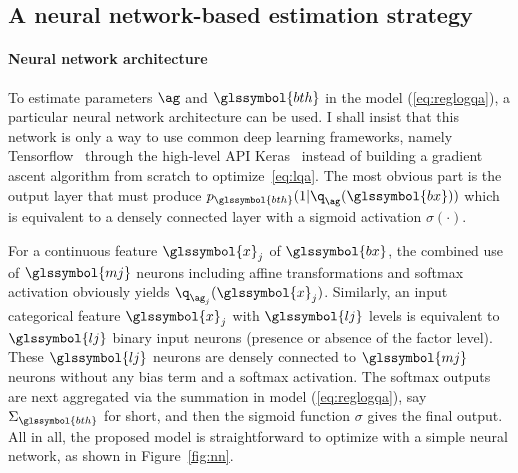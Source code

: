 \subsection{A neural network-based estimation strategy} \label{sec:estim}

\paragraph{Neural network architecture}

To estimate parameters $\ag$ and $\glssymbol{bth}$ in the model (\ref{eq:reglogqa}), a particular neural network architecture can be used. I shall insist that this network is only a way to use common deep learning frameworks, namely Tensorflow~\cite{tensorflow2015-whitepaper} through the high-level API Keras~\cite{chollet2015keras} instead of building a gradient ascent algorithm from scratch to optimize~\eqref{eq:lqa}. The most obvious part is the output layer that must produce $p_{\glssymbol{bth}}(1|\q_{\ag}(\glssymbol{bx}))$ which is equivalent to a densely connected layer with a sigmoid activation $\sigma (\cdot)$.

For a continuous feature $\glssymbol{x}_j$ of $\glssymbol{bx}$, the combined use of $\glssymbol{mj}$ neurons including affine transformations and softmax activation obviously yields $\q_{\ag_{j}}(\glssymbol{x}_j)$. Similarly, an input categorical feature $\glssymbol{x}_j$ with $\glssymbol{lj}$ levels is equivalent to $\glssymbol{lj}$ binary input neurons (presence or absence of the factor level). These $\glssymbol{lj}$ neurons are densely connected to $\glssymbol{mj}$ neurons without any bias term and a softmax activation. The softmax outputs are next aggregated via the summation in model (\ref{eq:reglogqa}), say $\Sigma_{\glssymbol{bth}}$ for short, and then the sigmoid function $\sigma$ gives the final output. All in all, the proposed model is straightforward to optimize with a simple neural network, as shown in Figure~\ref{fig:nn}.


\def\layersep{2.5cm}

